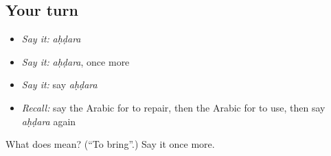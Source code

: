 \subsection*{Your turn}
\begin{itemize}
\raggedright
  \item \emph{Say it:} \emph{aḥḍara}
  \item \emph{Say it:} \emph{aḥḍara}, once more
  \item \emph{Say it:} say \emph{aḥḍara}
  \item \emph{Recall:} say the Arabic for to repair, then the Arabic for to use, then say \emph{aḥḍara} again
\end{itemize}

\begin{tcolorbox}[breakable,colback=teal!4,colframe=teal!35!black,title={Before you move on}]
What does  mean? (\textquotedblleft{}To bring\textquotedblright{}.) Say it once more.
\end{tcolorbox}
